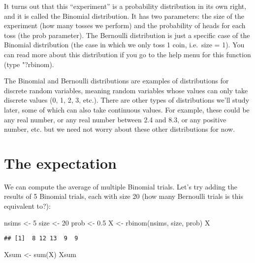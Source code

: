 \documentclass[
]{book}
\newenvironment{Shaded}{\begin{snugshade}}{\end{snugshade}}
\newcommand{\DecValTok}[1]{\textcolor[rgb]{0.00,0.00,0.81}{#1}}
\newcommand{\FloatTok}[1]{\textcolor[rgb]{0.00,0.00,0.81}{#1}}
\newcommand{\FunctionTok}[1]{\textcolor[rgb]{0.00,0.00,0.00}{#1}}
\newcommand{\NormalTok}[1]{#1}
\newcommand{\OtherTok}[1]{\textcolor[rgb]{0.56,0.35,0.01}{#1}}
\begin{document}
It turns out that this ``experiment'' is a probability distribution in its own right, and it is called the Binomial distribution. It has two parameters: the size of the experiment (how many tosses we perform) and the probability of heads for each toss (the prob parameter). The Bernoulli distribution is just a specific case of the Binomial distribution (the case in which we only toss 1 coin, i.e.~size = 1). You can read more about this distribution if you go to the help menu for this function (type "?rbinom).

The Binomial and Bernoulli distributions are examples of distributions for discrete random variables, meaning random variables whose values can only take discrete values (0, 1, 2, 3, etc.). There are other types of distributions we'll study later, some of which can also take continuous values. For example, these could be any real number, or any real number between 2.4 and 8.3, or any positive number, etc. but we need not worry about these other distributions for now.

\hypertarget{the-expectation}{%
\section{The expectation}\label{the-expectation}}

We can compute the average of multiple Binomial trials. Let's try adding the results of 5 Binomial trials, each with size 20 (how many Bernoulli trials is this equivalent to?):

\begin{Shaded}
\begin{Highlighting}[]
\NormalTok{nsims }\OtherTok{\textless{}{-}} \DecValTok{5}
\NormalTok{size }\OtherTok{\textless{}{-}} \DecValTok{20}
\NormalTok{prob }\OtherTok{\textless{}{-}} \FloatTok{0.5}
\NormalTok{X }\OtherTok{\textless{}{-}} \FunctionTok{rbinom}\NormalTok{(nsims, size, prob)}
\NormalTok{X}
\end{Highlighting}
\end{Shaded}

\begin{verbatim}
## [1]  8 12 13  9  9
\end{verbatim}

\begin{Shaded}
\begin{Highlighting}[]
\NormalTok{Xsum }\OtherTok{\textless{}{-}} \FunctionTok{sum}\NormalTok{(X)}
\NormalTok{Xsum}
\end{Highlighting}
\end{Shaded}
\end{document}
